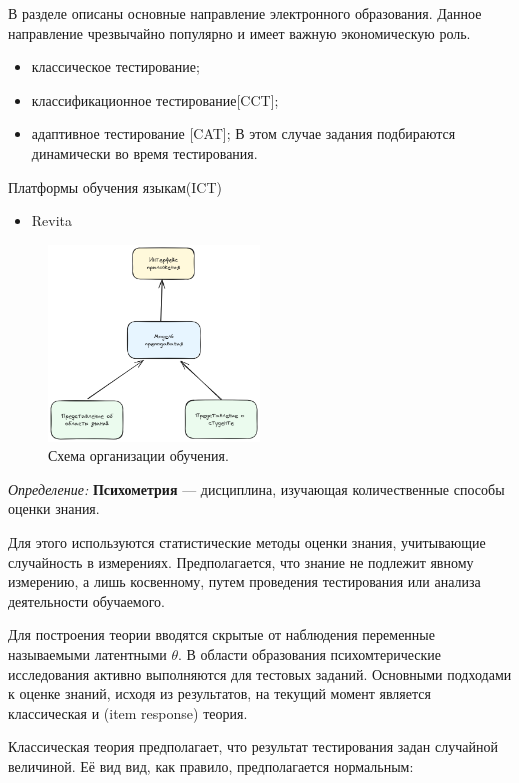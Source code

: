В разделе описаны основные направление электронного образования. Данное направление чрезвычайно популярно и имеет важную экономическую роль.
\begin{itemize}
    \item классическое тестирование;
    \item классификационное тестирование[CCT];
    \item адаптивное тестирование [CAT];
    В этом случае задания подбираются динамически во время тестирования.
\end{itemize}


Платформы обучения языкам(ICT) 
\begin{itemize}
    \item Revita \cite{katinskaia2018revita}
\end{itemize}

\begin{figure}[h]
    \centering
    \includegraphics[width=0.5\textwidth]{assets/pedagogic/social/its.excalidraw.png}
    \caption{Схема организации обучения.}
    \label{bkt}
\end{figure}


\textit{Определение:} \textbf{Психометрия} --- дисциплина, изучающая количественные способы оценки знания.

Для этого используются статистические методы оценки знания, учитывающие случайность в измерениях. Предполагается, что знание не подлежит явному измерению,
а лишь косвенному, путем проведения тестирования или анализа деятельности обучаемого.

Для построения теории вводятся скрытые от наблюдения переменные называемыми латентными $\theta$. 
В области образования психомтерические исследования активно выполняются для тестовых заданий. Основными подходами к оценке знаний, исходя из результатов, 
на текущий момент является классическая и (item response) теория.

Классическая теория предполагает, что результат тестирования задан случайной величиной. Её вид вид, как правило, предполагается нормальным:

